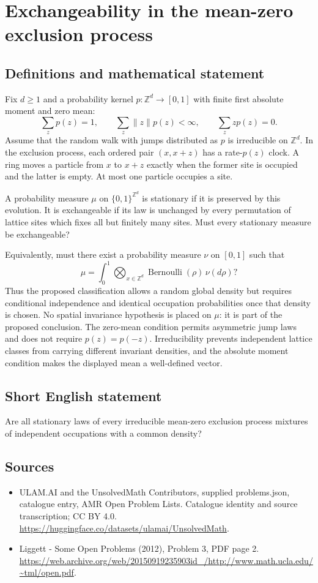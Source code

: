 \documentclass[11pt,a4paper]{article}
\begin{document}
\section*{Exchangeability in the mean-zero exclusion process}\label{statement}

\subsection{Definitions and mathematical statement}
Fix $d\ge1$ and a probability kernel $p:\mathbb Z^d\to[0,1]$ with finite first absolute moment and zero mean:
\[
\sum_z p(z)=1,\qquad \sum_z\|z\|p(z)<\infty,
\qquad \sum_z z p(z)=0.
\]
Assume that the random walk with jumps distributed as $p$ is irreducible on $\mathbb Z^d$. In the exclusion process, each ordered pair $(x,x+z)$ has a rate-$p(z)$ clock. A ring moves a particle from $x$ to $x+z$ exactly when the former site is occupied and the latter is empty. At most one particle occupies a site.

A probability measure $\mu$ on $\{0,1\}^{\mathbb Z^d}$ is stationary if it is preserved by this evolution. It is exchangeable if its law is unchanged by every permutation of lattice sites which fixes all but finitely many sites. Must every stationary measure be exchangeable?

Equivalently, must there exist a probability measure $\nu$ on $[0,1]$ such that
\[
\mu=\int_0^1\bigotimes_{x\in\mathbb Z^d}\operatorname{Bernoulli}(\rho)\,\nu(d\rho)?
\]
Thus the proposed classification allows a random global density but requires conditional independence and identical occupation probabilities once that density is chosen. No spatial invariance hypothesis is placed on $\mu$: it is part of the proposed conclusion. The zero-mean condition permits asymmetric jump laws and does not require $p(z)=p(-z)$. Irreducibility prevents independent lattice classes from carrying different invariant densities, and the absolute moment condition makes the displayed mean a well-defined vector.
\subsection{Short English statement}
Are all stationary laws of every irreducible mean-zero exclusion process mixtures of independent occupations with a common density?
\subsection{Sources}
\begin{itemize}
\item[S1] ULAM.AI and the UnsolvedMath Contributors, supplied problems.json, catalogue entry, AMR Open Problem Lists. Catalogue identity and source transcription; CC BY 4.0.
\url{https://huggingface.co/datasets/ulamai/UnsolvedMath}.
\item[S2] Liggett - Some Open Problems (2012), Problem 3, PDF page 2. 
\url{https://web.archive.org/web/20150919235903id_/http://www.math.ucla.edu/~tml/open.pdf}.
\end{itemize}
\end{document}
